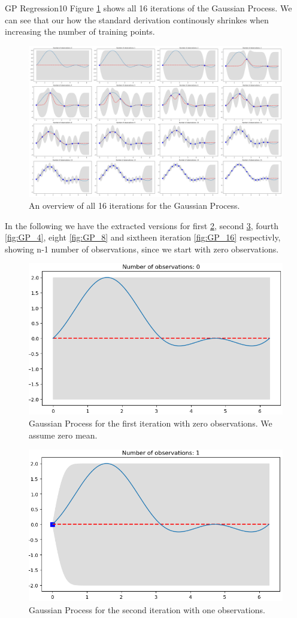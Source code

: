 \begin{questions}
\begin{question}{GP Regression}{10}
Figure \ref{fig:GP_all} shows all 16 iterations of the Gaussian Process. We can see that our how the standard derivation continously shrinkes when increasing the number of training points. 
\begin{figure}[H]
	\includegraphics[width=1.0\linewidth]{pictures/GP_all_plots.png}
	\centering
	\caption{An overview of all 16 iterations for the Gaussian Process.}
	\label{fig:GP_all}
\end{figure}

In the following we have the extracted versions for first \ref{fig:GP_1}, second \ref{fig:GP_2}, fourth \ref{fig:GP_4}, eight \ref{fig:GP_8} and sixtheen iteration \ref{fig:GP_16} respectivly, showing n-1 number of observations, since we start with zero observations.
\begin{figure}[H]
	\includegraphics[width=0.6\linewidth]{pictures/GP_plot_1.png}
	\centering
	\caption{Gaussian Process for the first iteration with zero observations. We assume zero mean.}
	\label{fig:GP_1}
\end{figure}

\begin{figure}[H]
	\includegraphics[width=0.6\linewidth]{pictures/GP_plot_2.png}
	\centering
	\caption{Gaussian Process for the second iteration with one observations.}
	\label{fig:GP_2}
\end{figure}


\end{question}
\end{questions}
